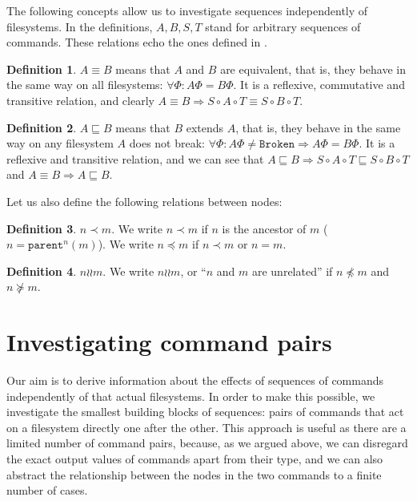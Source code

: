 \documentclass[12pt]{article}
\newcommand{\parent}{\mathtt{parent}}
\newcommand{\fsbroken}{\mathtt{Broken}} %
\newcommand{\FS}{\Phi} %
\newcommand{\cc}{\circ} %
\newcommand{\descendant}{\prec}
\newcommand{\descendantEq}{\preceq}
\newcommand{\ancestorEq}{\succeq}
\newcommand{\eqext}{\sqsubseteq} %
\newcommand{\indep}{\mathrel{\wr\wr}} %
\newcommand{\unrel}{\indep} %
\theoremstyle{definition}
\newtheorem{mydef}{Definition}
\begin{document}
The following concepts allow us to investigate sequences independently of filesystems.
In the definitions, $A,B,S,T$ stand for arbitrary sequences of commands.
These relations echo the ones defined in \cite{NREC:alg}.

\begin{mydef}
$A\equiv B$ means that $A$ and $B$ are equivalent,
that is, they behave in the same way on
all filesystems: $\forall \FS: A\FS=B\FS$.
It is a reflexive, commutative and transitive relation,
and clearly
$ A\equiv B \Rightarrow S\cc A\cc T\equiv S\cc B\cc T $.
\end{mydef}

\begin{mydef}
$A\eqext B$ means that $B$ extends $A$,
that is, they behave in the same way
on any filesystem $A$ does not break:
$\forall \FS: A\FS\neq\fsbroken\Rightarrow A\FS=B\FS$.
It is a reflexive and transitive relation,
and we can see that
$ A\eqext B \Rightarrow S\cc A\cc T\eqext S\cc B\cc T$
and
$ A\equiv B \Rightarrow A\eqext B$.
\end{mydef}

Let us also define the following relations between nodes:

\begin{mydef}{$n\descendant m$.}
We write $n\descendant m$ if $n$ is the ancestor of $m$ ($n=\parent^n(m)$). %
We write $n\descendantEq m$ if $n\descendant m$ or $n=m$.
\end{mydef}

\begin{mydef}{$n\unrel m$.}
We write $n\unrel m$, or ``$n$ and $m$ are unrelated'' if $n\not\descendantEq m$ and $n\not\ancestorEq m$.
\end{mydef}



\section{Investigating command pairs}

Our aim is to derive information about the effects of sequences
of commands independently of that actual filesystems.
In order to make this possible, we investigate the smallest building
blocks of sequences: pairs of commands that act on a filesystem directly one after the other.
This approach is useful as there are a limited number of command pairs,
because, as we argued above, we can disregard the exact output values of commands apart from their type,
and we can also abstract the relationship between the nodes in the two commands
to a finite number of cases.
\end{document}
